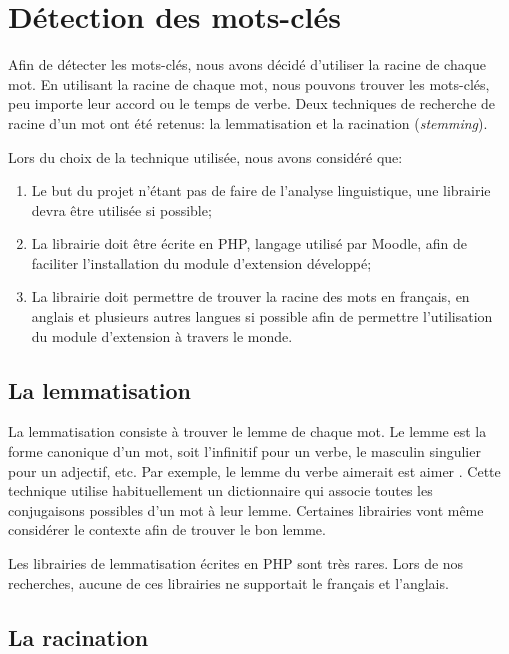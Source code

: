 \chapter{Détection des mots-clés}
\label{chap:keywords}

Afin de détecter les mots-clés, nous avons décidé d'utiliser la racine de chaque mot.
En utilisant la racine de chaque mot, nous pouvons trouver les mots-clés, peu importe leur accord ou le temps de verbe.
Deux techniques de recherche de racine d'un mot ont été retenus: la lemmatisation et la racination (\textit{stemming}).

Lors du choix de la technique utilisée, nous avons considéré que:

\begin{enumerate}
  \item Le but du projet n'étant pas de faire de l'analyse linguistique, une librairie devra être utilisée si possible;
  \item La librairie doit être écrite en PHP, langage utilisé par Moodle, afin de faciliter l'installation du module d'extension développé;
  \item La librairie doit permettre de trouver la racine des mots en français, en anglais et plusieurs autres langues si possible afin de permettre l'utilisation du module d'extension à travers le monde.
\end{enumerate}

\section{La lemmatisation}

La lemmatisation consiste à trouver le lemme de chaque mot.
Le lemme est la forme canonique d'un mot, soit l'infinitif pour un verbe, le masculin singulier pour un adjectif, etc.
Par exemple, le lemme du verbe \og aimerait \fg{} est \og aimer \fg{}.
Cette technique utilise habituellement un dictionnaire qui associe toutes les conjugaisons possibles d'un mot à leur lemme.
Certaines librairies vont même considérer le contexte afin de trouver le bon lemme.

Les librairies de lemmatisation écrites en PHP sont très rares.
Lors de nos recherches, aucune de ces librairies ne supportait le français et l'anglais.

\section{La racination}

